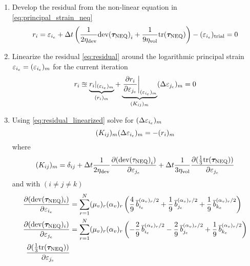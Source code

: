 \begin{enumerate}
    \item Develop the residual from the non-linear equation in \cref{eq:principal_strain_neq}
    \begin{equation}
       r_{i} = \varepsilon_{{i}_e} + \Delta t \left( \frac{1}{2\eta_{\text{dev}}} \text{dev}{(\bm{\tau}_{\text{NEQ}})}_{i} + \frac{1}{9\eta_{\text{vol}}} \text{tr}(\bm{\tau}_{\text{NEQ}}) \right) - ({\varepsilon_{{i}_e}})_\text{trial} = 0
       \label{eq:residual}
    \end{equation}
    \item Linearize the residual \cref{eq:residual}  around the logarithmic principal strain \(\varepsilon_{{i}_e} = (\varepsilon_{{i}_e})_{m}\) for the current iteration
    \begin{equation}
        r_{i} 
        \approxeq \underbrace{r_{i}|_{(\varepsilon_{{i}_e})_{m}}}_{(r_{i})_m} 
        + \underbrace{\left. \pdv{r_{i}}{\varepsilon_{{j}_e}} \right|_{(\varepsilon_{{i}_e})_{m}}}_{(K_{ij})_{m}} (\Delta \varepsilon_{{j}_e})_{m} = 0
        \label{eq:residual_linearized}
    \end{equation}
    \item Using \cref{eq:residual_linearized} solve for \((\Delta \varepsilon_{{i}_e})_{m}\)
    \begin{equation} 
        (K_{ij})_{m} (\Delta \varepsilon_{{i}_e})_{m} = -(r_{i})_{m}
        \label{eq:strain_increment_neq}
    \end{equation}
    where 
    \begin{equation}
        (K_{ij})_{m} = \delta_{ij} 
        + \Delta t \frac{1}{2\eta_{\text{dev}}} \pdv{({\text{dev}({\tau}_{\text{NEQ}})}_{i})}{\varepsilon_{{j}_e}} 
        + \Delta t \frac{1}{3\eta_{\text{vol}}} \pdv{(\frac{1}{3}\text{tr}(\bm{\tau}_{\text{NEQ}}))}{\varepsilon_{{j}_e}}
        \label{eq:K_newton_iteration}
    \end{equation}
    and with \(( i \neq j \neq k)\)
    \begin{align}
        \pdv{(\text{dev}(\tauneq)_{i})}{\prstrain{i}} 
        &= \sum_{r=1}^{N}\mumr \amr \left(
             \frac{4}{9} \,\sqprstretchdev{i}^{\amr/2}
            +\frac{1}{9} \,\sqprstretchdev{j}^{\amr/2}
            +\frac{1}{9} \,\sqprstretchdev{k}^{\amr/2} \right)  \label{eq:diff_prtauneqdevi_i}\\
        \pdv{(\text{dev}(\tauneq)_{i})}{\prstrain{j}} 
        &= \sum_{r=1}^{N}\mumr \amr \left(
            -\frac{2}{9} \,\sqprstretchdev{i}^{\amr/2}
            -\frac{2}{9} \,\sqprstretchdev{j}^{\amr/2}
            +\frac{1}{9} \,\sqprstretchdev{k}^{\amr/2} \right)  \label{eq:diff_prtauneqdevi_j}\\
        \pdv{(\frac{1}{3}\text{tr}(\tauneq))}{\prstrain{j}} 

\end{align}
\end{enumerate}
